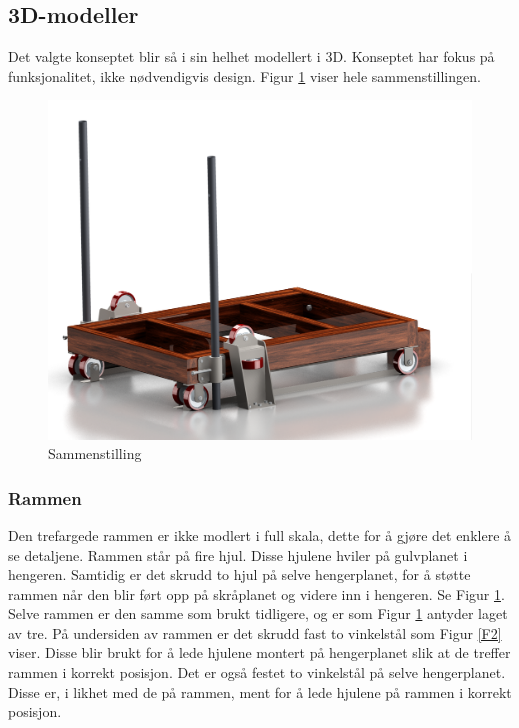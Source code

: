 \subsection{3D-modeller}
Det valgte konseptet blir så i sin helhet modellert i 3D. Konseptet har fokus på funksjonalitet, ikke nødvendigvis design. Figur \ref{F1} viser hele sammenstillingen. 

\begin{figure}[h!]
\centerline{\includegraphics [width=15cm]{images/1.png}}
\caption{Sammenstilling}
\label{F1}
\end{figure}

\subsubsection{Rammen}
Den trefargede rammen er ikke modlert i full skala, dette for å gjøre det enklere å se detaljene. 
Rammen står på fire hjul. Disse hjulene hviler på gulvplanet i hengeren. Samtidig er det skrudd to hjul på selve hengerplanet, for å støtte rammen når den blir ført opp på skråplanet og videre inn i hengeren. Se Figur \ref{F1}. Selve rammen er den samme som brukt tidligere, og er som Figur \ref{F1} antyder laget av tre. På undersiden av rammen er det skrudd fast to vinkelstål som Figur \ref{F2} viser. Disse blir brukt for å lede hjulene montert på hengerplanet slik at de treffer rammen i korrekt posisjon. 
Det er også festet to vinkelstål på selve hengerplanet. Disse er, i likhet med de på rammen, ment for å lede hjulene på rammen i korrekt posisjon.
 

